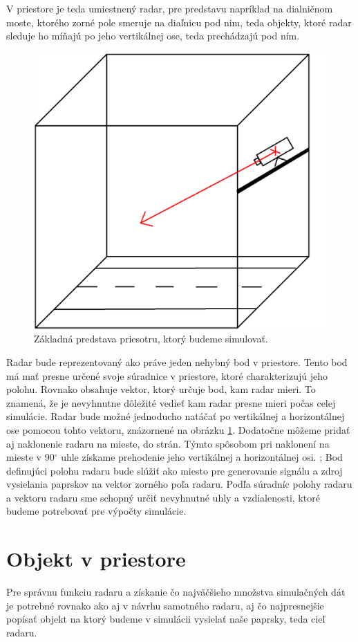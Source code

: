     V priestore je teda umiestnený radar, pre predstavu napríklad na dialničnom moste, ktorého zorné pole smeruje na diaľnicu pod nim, teda objekty, ktoré radar sleduje ho míňajú po jeho vertikálnej ose, teda prechádzajú pod ním.

    \begin{figure}[h]
        \centering
        \includegraphics[width=.5\textwidth]{obrazky-figures/cube_radar.png}
        \caption{Základná predstava priesotru, ktorý budeme simulovať.}
        \label{fig:cube_radar}
    \end{figure}

    Radar bude reprezentovaný ako práve jeden nehybný bod v priestore. Tento bod má mať presne určené svoje súradnice v priestore, ktoré charakterizujú jeho polohu. Rovnako obsahuje vektor, ktorý určuje bod, kam radar mieri. To znamená, že je nevyhnutne dôležité vedieť kam radar presne mieri počas celej simulácie. Radar bude možné jednoducho natáčať po vertikálnej a horizontálnej ose pomocou tohto vektoru, znázornené na obrázku \ref{fig:cube_radar}. 
    Dodatočne môžeme pridať aj naklonenie radaru na mieste, do strán. Týmto spôsobom pri naklonení na mieste v 90$^{\circ}$ uhle získame prehodenie jeho vertikálnej a horizontálnej osi.
    ;
    Bod definujúci polohu radaru bude slúžiť ako miesto pre generovanie signálu a zdroj vysielania paprskov na vektor zorného poľa radaru. Podľa súradníc polohy radaru a vektoru radaru sme schopný určiť nevyhnutné uhly a vzdialenosti, ktoré budeme potrebovať pre výpočty simulácie.

  \section{Objekt v priestore}
    \hspace{0.6cm}Pre správnu funkciu radaru a získanie čo najväčšieho množstva simulačných dát je potrebné rovnako ako aj v návrhu samotného radaru, aj čo najpresnejšie popísať objekt na ktorý budeme v simulácii vysielať naše paprsky, teda cieľ radaru. 

